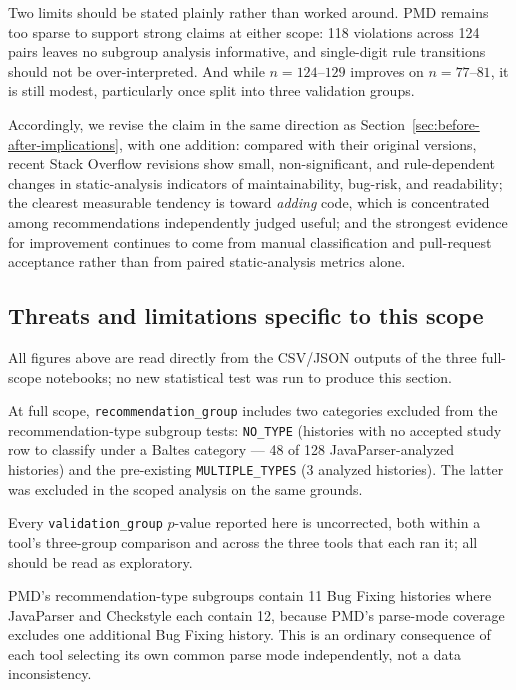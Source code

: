 Two limits should be stated plainly rather than worked around.
PMD remains too sparse to support strong claims at either scope: 118 violations across 124 pairs leaves no subgroup analysis informative, and single-digit rule transitions should not be over-interpreted.
And while $n=124$--$129$ improves on $n=77$--$81$, it is still modest, particularly once split into three validation groups.

Accordingly, we revise the claim in the same direction as Section~\ref{sec:before-after-implications}, with one addition: compared with their original versions, recent Stack Overflow revisions show small, non-significant, and rule-dependent changes in static-analysis indicators of maintainability, bug-risk, and readability; the clearest measurable tendency is toward \emph{adding} code, which is concentrated among recommendations independently judged useful; and the strongest evidence for improvement continues to come from manual classification and pull-request acceptance rather than from paired static-analysis metrics alone.

\subsection{Threats and limitations specific to this scope}
\label{sec:ba-full-limitations}

All figures above are read directly from the CSV/JSON outputs of the three full-scope notebooks; no new statistical test was run to produce this section.

At full scope, \texttt{recommendation\_group} includes two categories excluded from the recommendation-type subgroup tests: \texttt{NO\_TYPE} (histories with no accepted study row to classify under a Baltes category --- 48 of 128 JavaParser-analyzed histories) and the pre-existing \texttt{MULTIPLE\_TYPES} (3 analyzed histories).
The latter was excluded in the scoped analysis on the same grounds.

Every \texttt{validation\_group} $p$-value reported here is uncorrected, both within a tool's three-group comparison and across the three tools that each ran it; all should be read as exploratory.

PMD's recommendation-type subgroups contain 11 Bug Fixing histories where JavaParser and Checkstyle each contain 12, because PMD's parse-mode coverage excludes one additional Bug Fixing history.
This is an ordinary consequence of each tool selecting its own common parse mode independently, not a data inconsistency.

